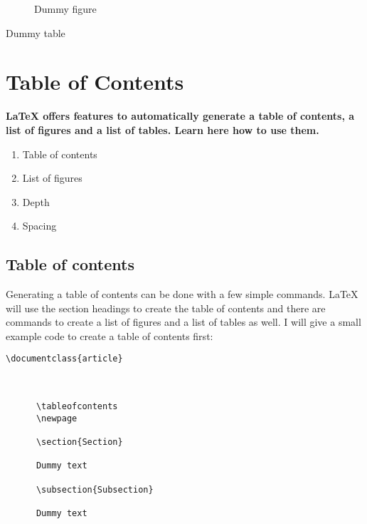 \maketitle
\newpage

\begin{figure}
  \caption{Dummy figure}
\end{figure}
\begin{table}
  \caption{Dummy table}
\end{table}


\maketitle
\newpage
\section{Table of Contents}
  \textbf{LaTeX offers features to automatically generate a table of contents, a list of figures and a list of tables. Learn here how to use them.}
  \begin{enumerate} %
    \item Table of contents
    \item List of figures
    \item Depth
    \item Spacing
  \end{enumerate} 
  \subsection{Table of contents}
    Generating a table of contents can be done with a few simple commands. LaTeX will use the section headings to create the table of contents and there are commands to create a list of figures and a list of tables as well. I will give a small example code to create a table of contents first:

    \begin{lstlisting}[language={[LaTeX]TeX}, breaklines=true,frame=single]
      \documentclass{article}

      
      
      \tableofcontents
      \newpage
      
      \section{Section}
      
      Dummy text
      
      \subsection{Subsection}
      
      Dummy text
      
      
    \end{lstlisting}

